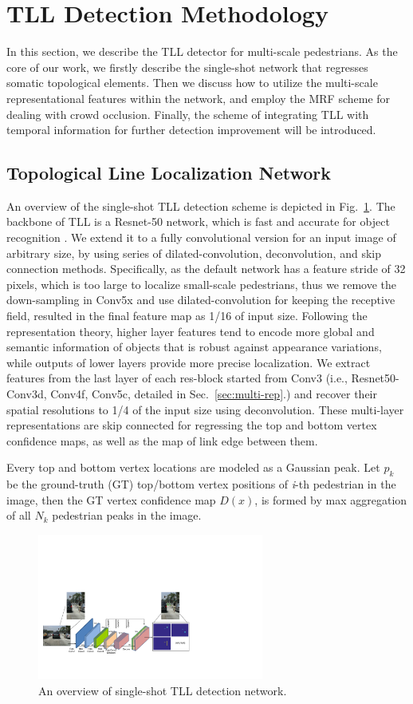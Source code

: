 \documentclass[runningheads]{llncs}
\begin{document}
\section{TLL Detection Methodology}
\label{sec:proposed}

In this section, we describe the TLL detector for multi-scale pedestrians. As the core of our work, we firstly describe the single-shot network that regresses somatic topological elements. Then we discuss how to utilize the multi-scale representational features within the network, and employ the MRF scheme for dealing with crowd occlusion. Finally, the scheme of integrating TLL with temporal information for further detection improvement will be introduced.

\subsection{Topological Line Localization Network}
An overview of the single-shot TLL detection scheme is depicted in Fig.~\ref{fig3}. The backbone of TLL is a Resnet-50 network, which is fast and accurate for object recognition \cite{ResNet}. We extend it to a fully convolutional version for an input image of arbitrary size, by using series of dilated-convolution, deconvolution, and skip connection methods. Specifically, as the default network has a feature stride of 32 pixels, which is too large to localize small-scale pedestrians, thus we remove the down-sampling in Conv5x and use dilated-convolution for keeping the receptive field, resulted in the final feature map as 1/16 of input size. Following the representation theory, higher layer features tend to encode more global and semantic information of objects that is robust against appearance variations, while outputs of lower layers provide more precise localization. We extract features from the last layer of each res-block started from Conv3 (i.e., Resnet50-Conv3d, Conv4f, Conv5c, detailed in Sec.~\ref{sec:multi-rep}.) and recover their spatial resolutions to 1/4 of the input size using deconvolution. These multi-layer representations are skip connected for regressing the top and bottom vertex confidence maps, as well as the map of link edge between them.

Every top and bottom vertex locations are modeled as a Gaussian peak. Let $p_{k}$ be the ground-truth (GT) top/bottom vertex positions of {\it i}-th pedestrian in the image, then the GT vertex confidence map $D(x)$, is formed by max aggregation of all ${N_{k}}$ pedestrian peaks in the image.
\begin{figure}[t]
	\centering
	\includegraphics[height=4.8cm]{3_res50.pdf}
	\caption{An overview of single-shot TLL detection network.}
	\label{fig3}
\end{figure}
\end{document}
